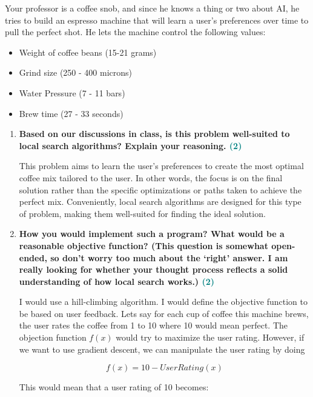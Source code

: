 \documentclass[a4paper]{article}
\begin{document}
\begin{sloppypar}
Your professor is a coffee snob, and since he knows a thing or two about AI, he tries to
build an espresso machine that will learn a user’s preferences over time to pull the perfect
shot. He lets the machine control the following values:

\begin{itemize}
    \item Weight of coffee beans (15-21 grams)
    \item Grind size (250 - 400 microns)
    \item Water Pressure (7 - 11 bars)
    \item Brew time (27 - 33 seconds)
\end{itemize}

\begin{enumerate}[start=9,label=Q\arabic*,left=0pt]
    \item \textbf{Based on our discussions in class, is this problem well-suited to local search algorithms? Explain your reasoning. \hfill \textcolor{teal}{(2)}}
    
    \par This problem aims to learn the user’s preferences to create the most optimal coffee mix tailored to the user. 
    In other words, the focus is on the final solution rather than the specific optimizations or paths taken to achieve the perfect mix. 
    Conveniently, local search algorithms are designed for this type of problem, making them well-suited for finding the ideal solution.
    
    \item \textbf{How you would implement such a program? What would be a reasonable objective function? (This question is somewhat open-ended, so don’t worry too much about the ‘right’ answer. I am really looking for whether your thought process reflects a solid understanding of how local search works.) \hfill \textcolor{teal}{(2)}}
    
    \par I would use a hill-climbing algorithm. I would define the objective function to be based on user feedback.
    Lets say for each cup of coffee this machine brews, the user rates the coffee from 1 to 10 where 10 would mean perfect.
    The objection function $f(x)$ would try to maximize the user rating. However, if we want to use gradient descent, we can manipulate the 
    user rating by doing 
    
    \[ f(x) = 10 - User Rating(x) \]

    This would mean that a user rating of 10 becomes:


\end{enumerate}
\end{sloppypar}
\end{document}
